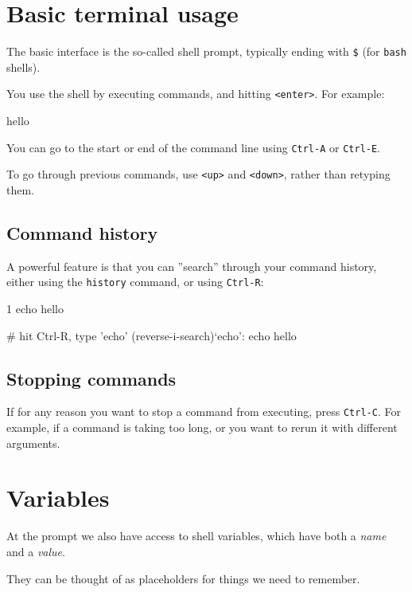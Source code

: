 \section{Basic terminal usage}

The basic interface is the so-called shell prompt, typically ending with \lstinline|$|
(for \lstinline|bash| shells).

You use the shell by executing commands, and hitting \lstinline|<enter>|. For example:

\begin{prompt}
hello
\end{prompt}

You can go to the start or end of the command line using \lstinline|Ctrl-A| or \lstinline|Ctrl-E|.

To go through previous commands, use \lstinline|<up>| and \lstinline|<down>|, rather than retyping them.

\subsection{Command history}

A powerful feature is that you can ''search'' through your command history, either using the \lstinline|history| command, or using \lstinline|Ctrl-R|:

\begin{prompt}
    1  echo hello

# hit Ctrl-R, type 'echo'
(reverse-i-search)`echo': echo hello
\end{prompt}

\subsection{Stopping commands}
If for any reason you want to stop a command from executing, press \lstinline|Ctrl-C|. For
example, if a command is taking too long, or you want to rerun it with different arguments.

\section{Variables}
\hypertarget{sec:environment-variables}{}

At the prompt we also have access to shell variables, which have both a \emph{name} and a \emph{value}.

They can be thought of as placeholders for things we need to remember.

